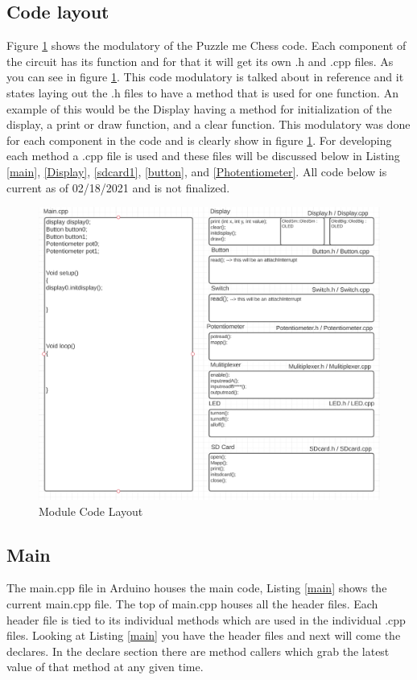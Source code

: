 \documentclass[11pt]{article}
\begin{document}
\subsection{Code layout}
Figure \ref{fig:MCL1} shows the modulatory of the Puzzle me Chess code. Each component of the circuit has its function and for that it will get its own .h and .cpp files. As you can see in figure \ref{fig:MCL1}. This code modulatory is talked about in reference \cite{stone} and it states laying out the .h files to have a method that is used for one function. An example of this would be the Display having a method for initialization of the display, a print or draw function, and a clear function. This modulatory was done for each component in the code and is clearly show in figure \ref{fig:MCL1}. For developing each method a .cpp file is used and these files will be discussed below in Listing \ref{main}, \ref{Display}, \ref{sdcard1}, \ref{button}, and \ref{Photentiometer}. All code below is current as of 02/18/2021 and is not finalized. 

\begin{figure}
  \includegraphics[width=\linewidth]{./Pics/code_layout.PNG}
  \caption{Module Code Layout}
  \label{fig:MCL1}
\end{figure}

\subsection{Main}
The main.cpp file in Arduino houses the main code, Listing \ref{main} shows the current main.cpp file. The top of main.cpp houses all the header files. Each header file is tied to its individual methods which are used in the individual .cpp files. Looking at Listing \ref{main} you have the header files and next will come the declares. In the declare section there are method callers which grab the latest value of that method at any given time.   
\\
\end{document}
